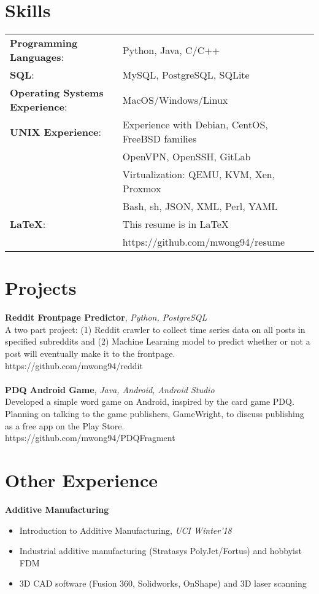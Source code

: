 \documentclass[line,margin]{res}
\begin{document}
\begin{resume}
    \section{Skills}
        \begin{tabular}{@{}ll}
            \textbf{Programming Languages}: & Python, Java, C/C++ \\
            \textbf{SQL}: & MySQL, PostgreSQL, SQLite \\
            \textbf{Operating Systems Experience}: & MacOS/Windows/Linux \\
            \textbf{UNIX Experience}: & Experience with Debian, CentOS, FreeBSD families \\
                                      & OpenVPN, OpenSSH, GitLab \\
                                      & Virtualization: QEMU, KVM, Xen, Proxmox \\
                                      & Bash, sh, JSON, XML, Perl, YAML \\
            \textbf{LaTeX}: & This resume is in LaTeX \\
                            & https://github.com/mwong94/resume \\
        \end{tabular}

    \section{Projects}
        \textbf{Reddit Frontpage Predictor}, {\sl Python, PostgreSQL} \\
        A two part project: (1) Reddit crawler to collect time series data on all posts in specified subreddits and (2) Machine Learning model to predict whether or not a post will eventually make it to the frontpage. \\
        https://github.com/mwong94/reddit \\\\
        \textbf{PDQ Android Game}, {\sl Java, Android, Android Studio} \\
        Developed a simple word game on Android, inspired by the card game PDQ. Planning on talking to the game publishers, GameWright, to discuss publishing as a free app on the Play Store. \\
        https://github.com/mwong94/PDQFragment

    \section{Other Experience}
        \textbf{Additive Manufacturing} \\
        \begin{itemize} \itemsep 3pt
            \item Introduction to Additive Manufacturing, {\sl UCI Winter'18}
            \item Industrial additive manufacturing (Stratasys PolyJet/Fortus) and hobbyist FDM
            \item 3D CAD software (Fusion 360, Solidworks, OnShape) and 3D laser scanning
        \end{itemize}
        \textbf{}
\end{resume}
\end{document}
